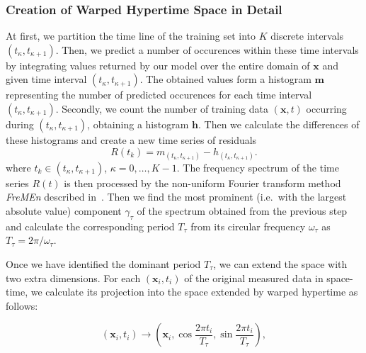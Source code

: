 \subsubsection{Creation of Warped Hypertime Space in Detail}

At first, we partition the time line of the training set into $K$ discrete intervals $(t_{\kappa} ,t_{\kappa + 1})$.
Then, we predict a number of occurences within these time intervals by integrating values returned by our model over the entire domain of $\mathbf{x}$ and given time interval $(t_{\kappa} ,t_{\kappa + 1})$.
The obtained values form a histogram $\mathbf{m}$ representing the number of predicted occurences for each time interval $(t_{\kappa} ,t_{\kappa + 1})$.
Secondly, we count the number of training data $(\mathbf{x},t)$ occurring during $(t_{\kappa},t_{\kappa + 1})$, obtaining a histogram $\mathbf{h}.$
Then we calculate the differences of these histograms and create a new time series of residuals
%
\begin{equation}
R(t_k) = m_{\left(t_{\kappa} ,t_{\kappa + 1}\right)} - h_{\left(t_{\kappa} ,t_{\kappa + 1}\right)}.
\end{equation}
where $t_{k} \in \left(t_{\kappa}, t_{\kappa + 1}\right)$, $\kappa = 0, \ldots, K - 1.$
%
The frequency spectrum of the time series $R(t)$ is then processed by the non-uniform Fourier transform method \textit{FreMEn} described in~\cite{krajnik2017fremen}. 
Then we find the most prominent (i.e.\ with the largest absolute value) component $\gamma_{\tau}$ of the spectrum obtained from the previous step and calculate the corresponding period $T_{\tau}$ from its circular frequency $\omega_{\tau}$ as $T_{\tau} = 2\pi/\omega_{\tau}$. 

Once we have identified the dominant period $T_{\tau}$, we can extend the space with two extra dimensions.
For each $\left(\mathbf{x}_i, t_i\right)$ of the original measured data in space-time, we calculate its projection into the space extended by warped hypertime as follows:

\begin{equation}
\left(\mathbf{x}_i, t_i\right) \rightarrow \left(\mathbf{x}_i, \cos{\frac{2\pi t_{i}}{T_{\tau}}}, \sin{\frac{2\pi t_{i}}{T_{\tau}}}\right),
\end{equation}

